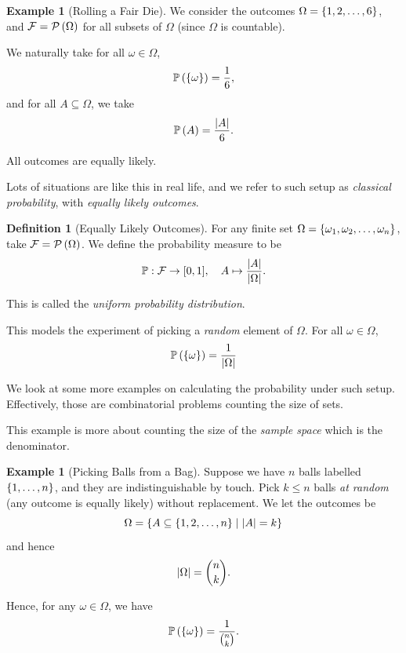 \documentclass{article}
\theoremstyle{definition}
\newtheorem{definition}[theorem]{Definition}
\newtheorem{example}[theorem]{Example}
\theoremstyle{remark}
\DeclarePairedDelimiter{\abs}{\lvert}{\rvert}
\newcommand{\Prob}{\mathbb{P}}
\newcommand{\eventSpace}{\mathcal{F}}
\newcommand{\powerset}{\mathcal{P}}
\newcommand{\ccintv}[2]{[#1,#2]}
\newcommand{\set}[2]{\{#1\mid #2\}}
\newcommand{\function}[5]{#1:#2\to #3,\quad #4\mapsto #5}
\begin{document}
\begin{example}[Rolling a Fair Die]
    \label{ex:rolling-a-fair-die}%
    We consider the outcomes \(\Omega = \left\{1, 2, \ldots, 6\right\}\), and \(\eventSpace = \powerset\pqty{\Omega}\) for all subsets of \(\Omega\) (since \(\Omega\) is countable).
        
    We naturally take for all \(\omega \in \Omega\),
    \[
        \Prob\pqty{\Bqty{\omega}} = \frac{1}{6},
    \]
    and for all \(A \subseteq \Omega\), we take
    \[
        \Prob\pqty{A} = \frac{\abs{A}}{6}.
    \]

    All outcomes are equally likely.
\end{example}

Lots of situations are like this in real life, and we refer to such setup as \emph{classical probability}, with \emph{equally likely outcomes}.

\begin{definition}[Equally Likely Outcomes]
    \label{def:equally-likely-outcomes}%
    For any finite set \(\Omega = \left\{\omega_1, \omega_2, \ldots, \omega_n\right\}\), take \(\eventSpace = \powerset\pqty{\Omega}\). We define the probability measure to be
    \[
        \function{\Prob}{\eventSpace}{\ccintv{0}{1}}{A}{\frac{\abs{A}}{\abs{\Omega}}.}
    \]

    This is called the \emph{uniform probability distribution}.
\end{definition}

This models the experiment of picking a \emph{random} element of \(\Omega\). For all \(\omega \in \Omega\),
\[
    \Prob\pqty{\Bqty{\omega}} = \frac{1}{\abs{\Omega}}
\]

We look at some more examples on calculating the probability under such setup. Effectively, those are combinatorial problems counting the size of sets.

This example is more about counting the size of the \emph{sample space} which is the denominator.

\begin{example}[Picking Balls from a Bag]
    \label{ex:picking-balls-from-bag}%
    Suppose we have \(n\) balls labelled \(\left\{1, \ldots, n\right\}\), and they are indistinguishable by touch. Pick \(k \leq n\) balls \emph{at random} (any outcome is equally likely) without replacement. We let the outcomes be
    \[
        \Omega = \set{A \subseteq \Bqty{1, 2, \ldots, n}}{\abs{A} = k}
    \]
    and hence
    \[
        \abs{\Omega} = \binom{n}{k}.
    \]

    Hence, for any \(\omega \in \Omega\), we have
    \[
        \Prob\pqty{\Bqty{\omega}} = \frac{1}{\binom{n}{k}}.
    \]
\end{example}
\end{document}
